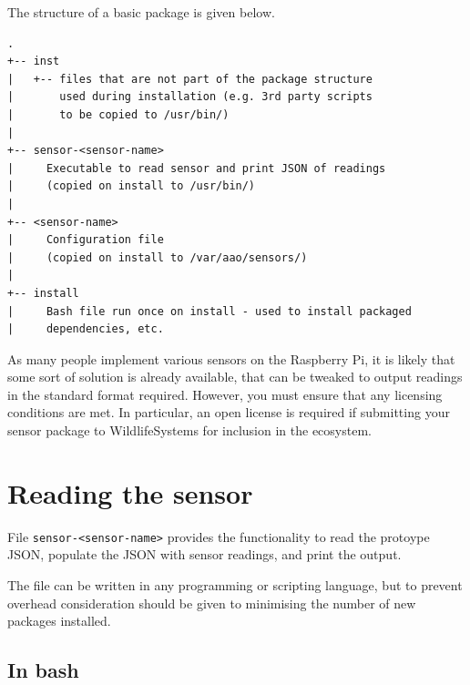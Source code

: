\documentclass[
]{book}
\begin{document}
The structure of a basic package is given below.

\begin{verbatim}
.
+-- inst
|   +-- files that are not part of the package structure
|       used during installation (e.g. 3rd party scripts 
|       to be copied to /usr/bin/)
|
+-- sensor-<sensor-name>
|     Executable to read sensor and print JSON of readings
|     (copied on install to /usr/bin/)
|
+-- <sensor-name>
|     Configuration file 
|     (copied on install to /var/aao/sensors/)
|
+-- install
|     Bash file run once on install - used to install packaged
|     dependencies, etc.
\end{verbatim}

As many people implement various sensors on the Raspberry Pi, it is likely that some sort of solution is already available, that can be tweaked to output readings in the standard format required. However, you must ensure that any licensing conditions are met. In particular, an open license is required if submitting your sensor package to WildlifeSystems for inclusion in the ecosystem.

\section{Reading the sensor}\label{reading-the-sensor}

File \texttt{sensor-\textless{}sensor-name\textgreater{}} provides the functionality to read the protoype JSON, populate the JSON with sensor readings, and print the output.

The file can be written in any programming or scripting language, but to prevent overhead consideration should be given to minimising the number of new packages installed.

\subsection{In bash}\label{in-bash}
\end{document}
